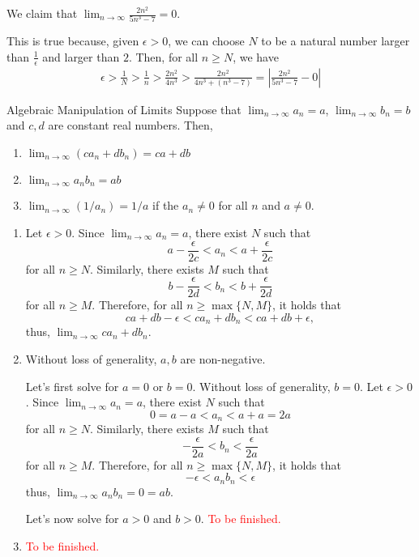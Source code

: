 
\begin{exmp}{}{}
	We claim that \(\lim_{n\to\infty} \frac{2n^2}{5n^3 - 7} = 0\).

	This is true because, given  \(\epsilon > 0\), we can choose \(N\) to be a natural number larger than \(\frac{1}{\epsilon}\) and larger than \(2\). Then, for all  \(n \geq N\), we have \begin{align*}
		\epsilon > \frac{1}{N} > \frac{1}{n} > \frac{2n^2}{4n^3} > \frac{2n^2}{4n^3 + (n^3 - 7)} = \left| \frac{2n^2}{5n^3 - 7} - 0 \right|
	\end{align*}
\end{exmp}

\begin{thm}{Algebraic Manipulation of Limits}{}
	Suppose that \(\lim_{n\to\infty} a_n = a\), \(\lim_{n\to\infty} b_n = b\) and \(c, d\) are constant real numbers. Then, 
	\begin{enumerate}
		\item \(\lim_{n\to\infty} (ca_n + db_n) = ca + db\)
		\item \(\lim_{n\to\infty} a_nb_n = ab\)
		\item \(\lim_{n\to\infty} (1/a_n) = 1/a\) if the \(a_n \neq 0\) for all  \(n\) and \(a \neq 0\).
	\end{enumerate} 
\end{thm}

\begin{dem}{}{}
	\begin{enumerate}
		\item Let \(\epsilon > 0\).
			Since \(\lim_{n\to\infty} a_n = a\), there exist \(N\) such that \[
				a - \frac{\epsilon}{2c} < a_n < a + \frac{\epsilon}{2c}
			\] 
			for all \(n \geq N\).
			Similarly, there exists \(M\) such that \[
				b - \frac{\epsilon}{2d} < b_n < b + \frac{\epsilon}{2d}
			\]
			for all \(n \geq M\).
			Therefore, for all \(n \geq \max\{N, M\}\), it holds that \[
				ca + db - \epsilon < ca_n + db_n < ca + db + \epsilon,
			\]
			thus, \(\lim_{n\to\infty} ca_n + db_n\).
		\item Without loss of generality, \(a, b\) are non-negative.

			Let's first solve for \(a = 0\) or \(b = 0\). Without loss of generality, \(b = 0\). Let \(\epsilon > 0\).
			Since \(\lim_{n\to\infty} a_n = a\), there exist \(N\) such that \[0 = a - a < a_n < a + a = 2a\] for all \(n \geq N\).
			Similarly, there exists \(M\) such that \[ -\frac{\epsilon}{2a} < b_n < \frac{\epsilon}{2a} \] for all \(n \geq M\).
			Therefore, for all \(n \geq \max\{N, M\}\), it holds that \[ -\epsilon < a_nb_n < \epsilon\]
			thus, \(\lim_{n\to\infty} a_nb_n = 0 = ab\).

			Let's now solve for \(a > 0\) and \(b > 0\). \textcolor{red}{To be finished.}

		\item \textcolor{red}{To be finished.}
	\end{enumerate}
\end{dem}
